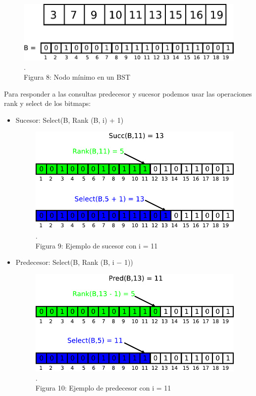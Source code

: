 \documentclass[11pt]{article}
\begin{document}
\begin{figure}[htp]
\centering
\includegraphics[scale=0.5]{bitmap.pdf}
\\\scriptsize{\color{white}.\color{black}\\Figura 8: Nodo mínimo en un BST}
\end{figure}
Para responder a las consultas predecesor y sucesor podemos usar las operaciones rank y select de los bitmaps:
\begin{itemize}
\item Sucesor: Select(B, Rank (B, i) + 1)
\begin{figure}[htp]
\centering
\includegraphics[scale=0.5]{bitmapsuc.pdf}
\\\scriptsize{\color{white}.\color{black}\\Figura 9: Ejemplo de sucesor con i = 11}
\end{figure}
\item Predecesor: Select(B, Rank (B, i $-$ 1))
\begin{figure}[htp]
\centering
\includegraphics[scale=0.5]{bitmappred.pdf}
\\\scriptsize{\color{white}.\color{black}\\Figura 10: Ejemplo de predecesor con i = 11}
\end{figure}
\end{itemize}
\end{document}
